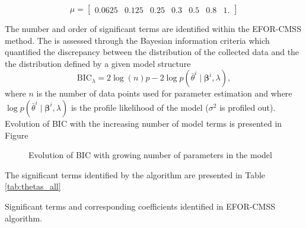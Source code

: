 \documentclass[a4paper,11pt,twoside]{article}
\theoremstyle{mytheoremstyle}
\begin{document}
\begin{equation*}
\mu = \left[\begin{array}{ccccccc}0.0625 & 0.125 & 0.25 & 0.3 & 0.5 & 0.8 & 1.
\end{array}\right]
\end{equation*}
\par The number and order of significant terms are identified within the EFOR-CMSS method.
The is assessed through the Bayesian information criteria which quantified the discrepancy between the distribution of the collected data and the the distribution defined by a given model structure
\begin{equation}
\text{BIC}_{\lambda} = 2\log(n) p - 2\log p(\bar{\theta}^i \mid \mathbf{\beta}^i, \lambda),
\end{equation}
where $n$ is the number of data points used for parameter estimation and where $\log p(\bar{\theta}^i \mid \mathbf{\beta}^i, \lambda)$ is the profile likelihood of the model ($\sigma^2$ is profiled out). Evolution of BIC with the increasing number of model terms is presented in Figure  

\begin{figure}[!h]
	\centering
	
	\caption{Evolution of BIC with growing number of parameters in the model}\label{fig:bic}
\end{figure}	
\par The significant terms identified by the algorithm are presented in Table \ref{tab:thetas_all}
\begin{table}[!h]
	\centering
	\caption{Significant terms and corresponding coefficients identified in EFOR-CMSS algorithm.}\label{tab:theetas_all}
	\small
	
\end{table} 
\end{document}
